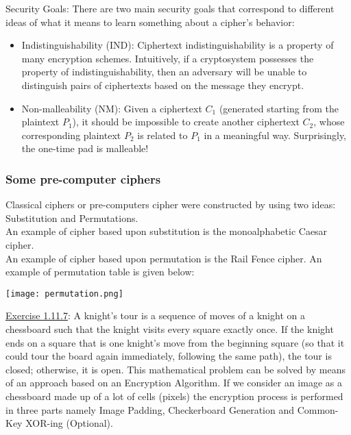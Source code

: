 \documentclass{article}
\begin{document}
Security Goals:
There are two main security goals that correspond to different ideas of what it means to learn something about a cipher's behavior:
\begin{itemize}
    \item Indistinguishability (IND): Ciphertext indistinguishability is a property of many encryption schemes. Intuitively, if a cryptosystem possesses the property of indistinguishability, then an adversary will be unable to distinguish pairs of ciphertexts based on the message they encrypt.
    \item Non-malleability (NM): Given a ciphertext $C_1$ (generated starting from the plaintext $P_1$), it should be impossible to create another ciphertext $C_2$, whose corresponding plaintext $P_2$ is related to $P_1$ in a meaningful way. Surprisingly, the one-time pad is malleable!
\end{itemize}

\subsubsection{Some pre-computer ciphers}
Classical ciphers or pre-computers cipher were constructed by using two ideas:
Substitution and Permutations.\\
An example of cipher based upon substitution is the monoalphabetic Caesar cipher.\\
An example of cipher based upon permutation is the Rail Fence cipher. An example of permutation table is given below:

\begin{center}
\texttt{[image: permutation.png]}
\end{center}

\underline{Exercise 1.11.7}: A knight's tour is a sequence of moves of a knight on a chessboard such that the knight visits every square exactly once. If the knight ends on a square that is one knight's move from the beginning square (so that it could tour the board again immediately, following the same path), the tour is closed; otherwise, it is open. This mathematical problem can be solved by means of an approach based on an Encryption Algorithm. If we consider an image as a chessboard made up of a lot of cells (pixels) the encryption process is performed in three parts namely Image Padding, Checkerboard Generation and Common-Key XOR-ing (Optional).
\end{document}
